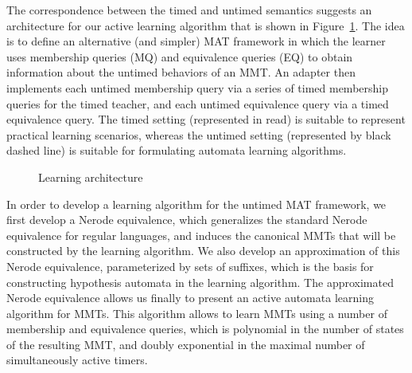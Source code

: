The correspondence between the timed and untimed semantics suggests an architecture for our active learning algorithm that is shown in Figure~\ref{architecture}.
The idea is to define an alternative (and simpler) MAT framework in which the learner uses membership queries (MQ) and equivalence queries (EQ)
to obtain information about the untimed behaviors of an MMT.
An adapter then implements each untimed membership query via a series of timed membership queries for the timed teacher,
and each untimed equivalence query via a timed equivalence query.
The timed setting (represented in read)
is suitable to represent practical learning scenarios, whereas the
untimed setting (represented by black dashed line)
is suitable for formulating automata learning
algorithms. 
\begin{figure}[h]
\begin{center}
\end{center}
\caption{Learning architecture}
\label{architecture}
\end{figure}

In order to develop a learning algorithm for the untimed MAT framework, we first develop
a Nerode equivalence, which generalizes the standard Nerode equivalence for
regular languages, and induces the canonical MMTs that will be constructed by the learning algorithm. 
We also develop an approximation of this Nerode equivalence,
parameterized by sets of suffixes, which is the basis for constructing
hypothesis automata in the learning algorithm. The approximated Nerode
equivalence allows us finally to present an active automata learning
algorithm for MMTs. This algorithm allows to learn MMTs using a number
of membership and equivalence queries, which is polynomial in the number of
states of the resulting MMT, and doubly exponential in the maximal number of
simultaneously active timers.

